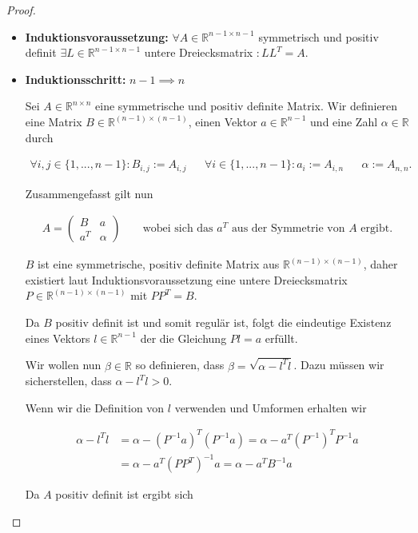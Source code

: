 \documentclass[titlepage]{article}
\begin{document}
\begin{proof}
\begin{itemize}
		\item \textbf{Induktionsvoraussetzung:} $\forall A \in \mathbb{R}^{n - 1 \times n - 1}$ symmetrisch und positiv definit $\exists L \in \mathbb{R}^{n - 1\times n - 1}$ untere Dreiecksmatrix $:LL^T=A$.
		
		\item \textbf{Induktionsschritt:} $n-1 \implies n$
		
		Sei $A \in \mathbb{R}^{n\times n}$ eine symmetrische und positiv definite Matrix. Wir definieren eine Matrix $B \in \mathbb{R}^{(n-1)\times(n-1)}$, einen Vektor $a \in \mathbb{R}^{n-1}$ und eine Zahl $\alpha \in \mathbb{R}$ durch
		
		\begin{align*}
			\forall i, j \in \{1, ..., n - 1\}: B_{i,j} := A_{i,j} && \forall i \in \{1, ..., n - 1\}: a_i := A_{i,n} && \alpha := A_{n,n}.
		\end{align*}
		
		Zusammengefasst gilt nun
		
		\begin{align*}
			A = \begin{pmatrix}
				B & a \\
				a^T & \alpha
			\end{pmatrix} && \text{ wobei sich das }a^T\text{ aus der Symmetrie von }A\text{ ergibt.}
		\end{align*}
	
		$B$ ist eine symmetrische, positiv definite Matrix aus $\mathbb{R}^{(n-1)\times(n-1)}$, daher existiert laut Induktionsvoraussetzung eine untere Dreiecksmatrix $P \in \mathbb{R}^{(n-1)\times(n-1)}$ mit $PP^T=B$.
		
		Da $B$ positiv definit ist und somit regulär ist, folgt die eindeutige Existenz eines Vektors $l \in \mathbb{R}^{n-1}$ der die Gleichung $Pl=a$ erfüllt.
		
		Wir wollen nun $\beta \in \mathbb{R}$ so definieren, dass $\beta = \sqrt{\alpha - l^Tl}$. Dazu müssen wir sicherstellen, dass $\alpha - l^Tl > 0$.
		
		Wenn wir die Definition von $l$ verwenden und Umformen erhalten wir
		
		\begin{align*}
			\alpha - l^Tl &= \alpha - (P^{-1}a)^T(P^{-1}a) = \alpha - a^T (P^{-1})^TP^{-1}a \\
			&= \alpha - a^T (PP^T)^{-1}a = \alpha - a^T B^{-1}a
		\end{align*}
	
		Da $A$ positiv definit ist ergibt sich
	

\end{itemize}
\end{proof}
\end{document}
